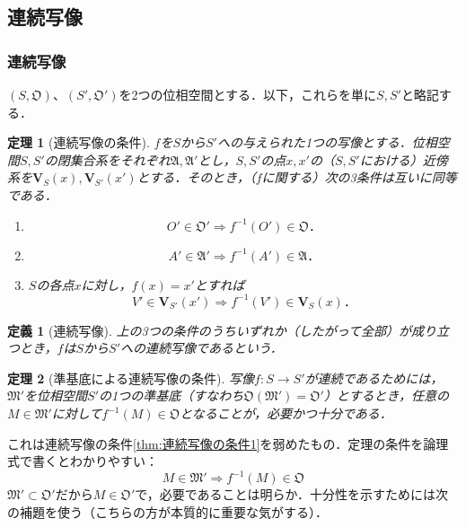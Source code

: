 \documentclass[a4paper,10pt,uplatex]{jsarticle}
\numberwithin{equation}{section}
\theoremstyle{mystyle}
\newtheorem{dfn}{定義}[section]
\newtheorem{thm}{定理}[section]
\newcommand{\gA}{\mathfrak{A}}
\newcommand{\gM}{\mathfrak{M}}
\newcommand{\gO}{\mathfrak{O}}
\begin{document}
\subsection{連続写像}
\subsubsection{連続写像}
$(S,\gO)$、$(S',\gO')$を2つの位相空間とする．以下，これらを単に$S,S'$と略記する．

\begin{thm}[連続写像の条件]
    $f$を$S$から$S'$への与えられた1つの写像とする．位相空間$S,S'$の閉集合系をそれぞれ$\gA,\gA'$とし，$S,S'$の点$x,x'$の（$S,S'$における）近傍系を$\bm{V}_S(x), \bm{V}_{S'}(x')$とする．そのとき，（$f$に関する）次の3条件は互いに同等である．
    \begin{enumerate}
        \item \hfill
        \vspace{-\abovedisplayskip} 
        \begin{equation}
            O' \in \gO' \Rightarrow f^{-1}(O') \in \gO．
        \end{equation} \label{thm:連続写像の条件1}
        \item \hfill
        \vspace{-\abovedisplayskip}
        \begin{equation}
            A' \in \gA' \Rightarrow f^{-1}(A') \in \gA．
        \end{equation}
        \item $S$の各点$x$に対し，$f(x) = x'$とすれば
        \begin{equation}
            V' \in \bm{V}_{S'}(x') \Rightarrow f^{-1}(V') \in \bm{V}_S(x)．
        \end{equation} \label{thm:連続写像の条件3}
    \end{enumerate}
\end{thm}

\begin{dfn}[連続写像]
    上の3つの条件のうちいずれか（したがって全部）が成り立つとき，$f$は$S$から$S'$への連続写像であるという．
\end{dfn}

\begin{thm}[準基底による連続写像の条件] \label{thm:準基底による連続写像の条件}
    写像$f:S \to S'$が連続であるためには，$\gM'$を位相空間$S'$の1つの準基底（すなわち$\gO(\gM') = \gO'$）とするとき，任意の$M \in \gM'$に対して$f^{-1}(M) \in \gO$となることが，必要かつ十分である．
\end{thm}
これは連続写像の条件\ref{thm:連続写像の条件1}を弱めたもの．定理の条件を論理式で書くとわかりやすい：
\begin{equation}
    M \in \gM' \Rightarrow f^{-1}(M) \in \gO
\end{equation}
$\gM' \subset \gO'$だから$M \in \gO'$で，必要であることは明らか．十分性を示すためには次の補題を使う（こちらの方が本質的に重要な気がする）．
\end{document}
